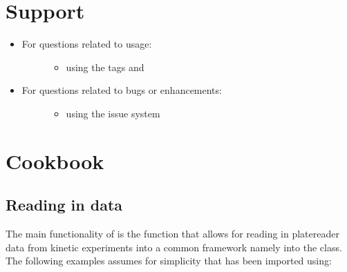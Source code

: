 \documentclass[letterpaper,10pt,english]{sphinxmanual}
\begin{document}
%
\begin{sphinxVerbatim}[commandchars=\\\{\}]
  
\end{sphinxVerbatim}


\chapter{Support}
\label{\detokenize{support:support}}\label{\detokenize{support::doc}}\begin{itemize}
\item {} \begin{description}
\item[{For questions related to usage:}] \leavevmode\begin{itemize}
\item {} 
 using the tags  and 

\end{itemize}

\end{description}

\item {} \begin{description}
\item[{For questions related to bugs or enhancements:}] \leavevmode\begin{itemize}
\item {} 
 using the issue system

\end{itemize}

\end{description}

\end{itemize}


\chapter{Cookbook}
\label{\detokenize{cookbook:cookbook}}\label{\detokenize{cookbook::doc}}

\section{Reading in data}
\label{\detokenize{cookbook:reading-in-data}}
The main functionality of  is the  function
that allows for reading in platereader data from kinetic experiments
into a common framework namely into the  class. The
following examples assumes for simplicity that  has been
imported using:
\end{document}
